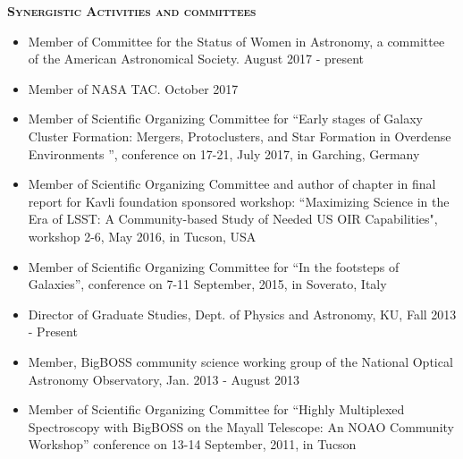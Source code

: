 \documentclass[11pt]{article}
\begin{document}
\begin{flushleft}
\vspace{-0.1in}
{\large {\bf \textsc{Synergistic Activities and committees}}
\hrulefill}
\end{flushleft}
\begin{itemize}
\item Member of Committee for the Status of Women in Astronomy, a committee of the American Astronomical Society. August 2017 - present

\item Member of NASA TAC. October 2017

\item Member of Scientific Organizing Committee for
  ``Early stages of Galaxy Cluster Formation: Mergers, Protoclusters, and Star Formation in Overdense Environments
'', conference on 17-21, July 2017, in Garching, Germany

\item Member of Scientific Organizing Committee and author of chapter in final report for Kavli foundation sponsored workshop: ``Maximizing Science in the Era of LSST: A Community-based Study of Needed US OIR Capabilities", workshop 2-6, May 2016, in Tucson, USA

\item Member of Scientific Organizing Committee for
  ``In the footsteps of Galaxies'', conference on 7-11 September, 2015, in Soverato, Italy


\item Director of Graduate Studies, Dept. of
  Physics and Astronomy, KU, Fall 2013 - Present
\item Member, BigBOSS community science working group
  of the National Optical Astronomy Observatory,
  Jan. 2013 - August 2013

\item Member of Scientific Organizing Committee for
  ``Highly Multiplexed Spectroscopy with BigBOSS on
  the Mayall Telescope: An NOAO Community Workshop''
  conference on 13-14 September, 2011, in Tucson


\end{itemize}
\end{document}

